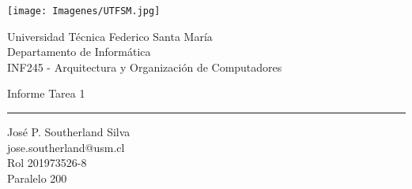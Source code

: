 \documentclass[a4paper,12pt]{article}
\begin{document}

\thispagestyle{empty} %

  \begin{minipage}{.2\linewidth}
    \begin{flushleft}
      \texttt{[image: Imagenes/UTFSM.jpg]}
    \end{flushleft} 
  \end{minipage}
  \hfill
  \begin{minipage}{.7\linewidth}
    \begin{flushright}
        Universidad Técnica Federico Santa María \\
        Departamento de Informática\\
        INF245 - Arquitectura y Organización de Computadores\\
    \end{flushright}
  \end{minipage}

\vfill %
\begin{center}
	{\huge Informe Tarea 1\\}
	\vspace{.5cm}
	\hrule
	\vspace{.5cm}
	{\large José P. Southerland Silva}\\
	jose.southerland@usm.cl\\
	Rol 201973526-8\\
	Paralelo 200\\
	
		
\end{center}
\vfill

\newpage
\tableofcontents
\newpage
\end{document}
